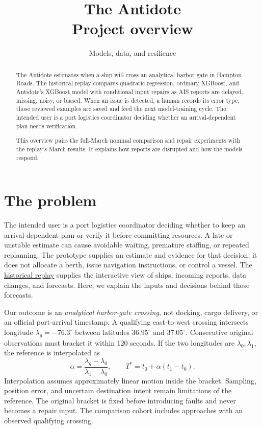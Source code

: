 \documentclass[11pt]{article}
\title{The Antidote\\[0.4em]\large Project overview}
\author{Models, data, and resilience}
\date{}
\begin{document}
\maketitle
\begin{abstract}
The Antidote estimates when a ship will cross an analytical harbor gate in Hampton Roads. The historical replay compares quadratic regression, ordinary XGBoost, and Antidote's XGBoost model with conditional input repairs as AIS reports are delayed, missing, noisy, or biased. When an issue is detected, a human records its error type; those reviewed examples are saved and feed the next model-training cycle. The intended user is a port logistics coordinator deciding whether an arrival-dependent plan needs verification.

This overview pairs the full-March nominal comparison and repair experiments with the replay's March results. It explains how reports are disrupted and how the models respond.
\end{abstract}
\setcounter{tocdepth}{1}
{\setlength{\parskip}{0pt}\tableofcontents}

\section{The problem}
The intended user is a port logistics coordinator deciding whether to keep an arrival-dependent plan or verify it before committing resources. A late or unstable estimate can cause avoidable waiting, premature staffing, or repeated replanning. The prototype supplies an estimate and evidence for that decision; it does not allocate a berth, issue navigation instructions, or control a vessel. The \href{/tracking/}{historical replay} supplies the interactive view of ships, incoming reports, data changes, and forecasts. Here, we explain the inputs and decisions behind those forecasts.

Our outcome is an \emph{analytical harbor-gate crossing}, not docking, cargo delivery, or an official port-arrival timestamp. A qualifying east-to-west crossing intersects longitude $\lambda_g=-76.3^\circ$ between latitudes $36.95^\circ$ and $37.05^\circ$. Consecutive original observations must bracket it within 120 seconds. If the two longitudes are $\lambda_0,\lambda_1$, the reference is interpolated as
\[
 \alpha=\frac{\lambda_g-\lambda_0}{\lambda_1-\lambda_0},\qquad
 T^*=t_0+\alpha(t_1-t_0).
\]
Interpolation assumes approximately linear motion inside the bracket. Sampling, position error, and uncertain destination intent remain limitations of the reference. The original bracket is fixed before introducing faults and never becomes a repair input. The comparison cohort includes approaches with an observed qualifying crossing.
\end{document}
